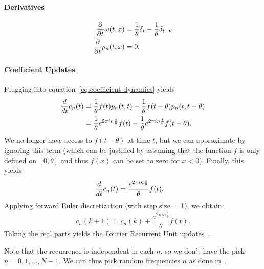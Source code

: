 \documentclass[../../hippo]{subfiles}
\begin{document}
\paragraph{Derivatives}
\begin{align*}
  \frac{\partial}{\partial t} \omega(t, x) &= \frac{1}{\theta} \delta_t - \frac{1}{\theta} \delta_{t-\theta}
  \\
  \frac{\partial}{\partial t} p_n(t, x) &= 0.
\end{align*}

\paragraph{Coefficient Updates}
Plugging into equation~\ref{eq:coefficient-dynamics} yields
\begin{align*}
  \frac{d}{d t} c_n(t)
  &= \frac{1}{\theta} f(t) p_n(t, t) - \frac{1}{\theta} f(t-\theta) p_n(t, t-\theta) \\
  &= \frac{1}{\theta} e^{2\pi i n \frac{t}{\theta}} f(t) - \frac{1}{\theta}  e^{2\pi i n \frac{t}{\theta}} f(t-\theta).
\end{align*}
We no longer have access to $f(t-\theta)$ at time $t$, but we can approximate by
ignoring this term (which can be justified by assuming that the function $f$ is
only defined on $[0, \theta]$ and thus $f(x)$ can be set to zero for $x < 0$).
Finally, this yields
\begin{align*}
  \frac{d}{d t} c_n(t) &= \frac{e^{2\pi i n \frac{t}{\theta}}}{\theta} f(t).
\end{align*}
Applying forward Euler discretization (with step size = 1), we obtain:
\begin{equation*}
  c_n(k+1) = c_{n}(k) + \frac{e^{2\pi i n \frac{t}{\theta}}}{\theta} f(t).
\end{equation*}
Taking the real parts yields the Fourier Recurrent Unit updates~\citep{zhang2018learning}.

Note that the recurrence is independent in each $n$, so we don't have the pick
$n = 0, 1, \dots, N - 1$.
We can thus pick random frequencies $n$ as done in~\citet{zhang2018learning}.
\end{document}
